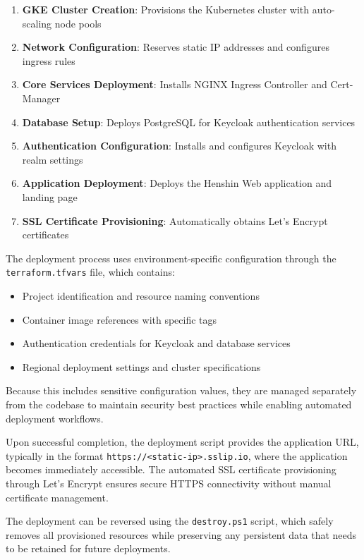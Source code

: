 \begin{enumerate}
    \item \textbf{GKE Cluster Creation}: Provisions the Kubernetes cluster with auto-scaling node pools
    \item \textbf{Network Configuration}: Reserves static IP addresses and configures ingress rules
    \item \textbf{Core Services Deployment}: Installs NGINX Ingress Controller and Cert-Manager
    \item \textbf{Database Setup}: Deploys PostgreSQL for Keycloak authentication services
    \item \textbf{Authentication Configuration}: Installs and configures Keycloak with realm settings
    \item \textbf{Application Deployment}: Deploys the Henshin Web application and landing page
    \item \textbf{SSL Certificate Provisioning}: Automatically obtains Let's Encrypt certificates
\end{enumerate}

The deployment process uses environment-specific configuration through the \texttt{terraform.tfvars} file, which contains:

\begin{itemize}
    \item Project identification and resource naming conventions
    \item Container image references with specific tags
    \item Authentication credentials for Keycloak and database services
    \item Regional deployment settings and cluster specifications
\end{itemize}

Because this includes sensitive configuration values, they are managed separately from the codebase to maintain security best practices while enabling automated deployment workflows.

Upon successful completion, the deployment script provides the application URL, typically in the format \texttt{https://<static-ip>.sslip.io}, where the application becomes immediately accessible. The automated SSL certificate provisioning through Let's Encrypt ensures secure HTTPS connectivity without manual certificate management.

The deployment can be reversed using the \texttt{destroy.ps1} script, which safely removes all provisioned resources while preserving any persistent data that needs to be retained for future deployments.